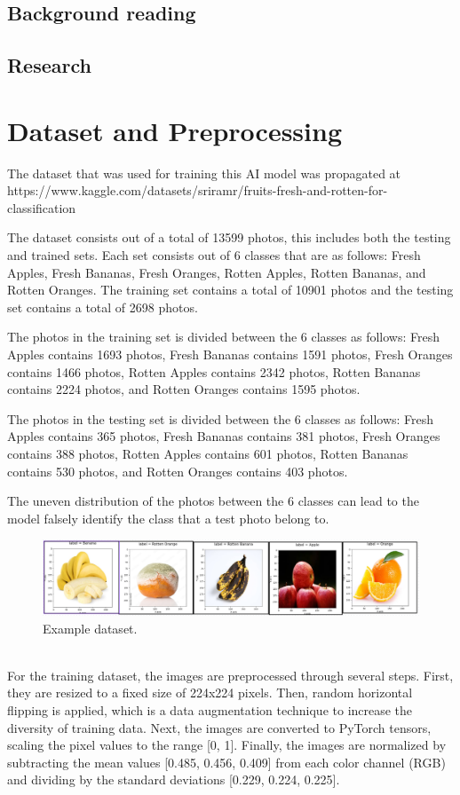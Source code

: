 \documentclass[conference]{IEEEtran}
\begin{document}
\subsection{Background reading}

\subsection{Research}

\section{Dataset and Preprocessing}

The dataset that was used for training this AI model was propagated at https://www.kaggle.com/datasets/sriramr/fruits-fresh-and-rotten-for-classification

The dataset consists out of a total of 13599 photos, this includes both the testing and trained sets. Each set consists out of 6 classes that are as follows: Fresh Apples, Fresh Bananas, Fresh Oranges, Rotten Apples, Rotten Bananas, and Rotten Oranges. The training set contains a total of 10901 photos and the testing set contains a total of 2698 photos.

The photos in the training set is divided between the 6 classes as follows: Fresh Apples contains 1693 photos, Fresh Bananas contains 1591 photos, Fresh Oranges contains 1466 photos, Rotten Apples contains 2342 photos, Rotten Bananas contains 2224 photos, and Rotten Oranges contains 1595 photos.

The photos in the testing set is divided between the 6 classes as follows: Fresh Apples contains 365 photos, Fresh Bananas contains 381 photos, Fresh Oranges contains 388 photos, Rotten Apples contains 601 photos, Rotten Bananas contains 530 photos, and Rotten Oranges contains 403 photos.

The uneven distribution of the photos between the 6 classes can lead to the model falsely identify the class that a test photo belong to.
\begin{figure}[h]
    \centering
    \includegraphics[width=\linewidth]{Example data.png}
    \caption{Example dataset.}
    \label{fig}
\end{figure}
\\
For the training dataset, the images are preprocessed through several steps. First, they are resized to a fixed size of 224x224 pixels. Then, random horizontal flipping is applied, which is a data augmentation technique to increase the diversity of training data. Next, the images are converted to PyTorch tensors, scaling the pixel values to the range [0, 1]. Finally, the images are normalized by subtracting the mean values [0.485, 0.456, 0.409] from each color channel (RGB) and dividing by the standard deviations [0.229, 0.224, 0.225].
\end{document}
